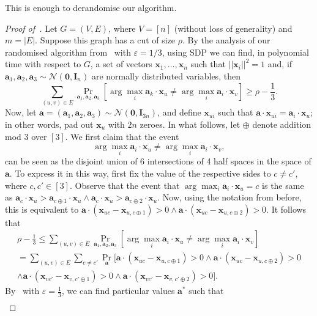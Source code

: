 \documentclass[a4paper,11pt, DIV=11]{scrartcl}
\newcommand{\vx}{\ensuremath{\mathbf{x}}}
\newcommand{\va}{\ensuremath{\mathbf{a}}}
\renewcommand{\epsilon}{\varepsilon}
\theoremstyle{plain}
\theoremstyle{definition}
\begin{document}
This is enough to derandomise our algorithm.

\begin{proof}[Proof of~]
    Let $G=(V,E)$, where $V = [n]$ (without loss of generality) and $m = |E|$.
    Suppose this graph has a cut of size $\rho$. By the analysis of our
    randomised algorithm from~ with $\epsilon=1/3$, using SDP we can find, in polynomial time with respect to $G$, a set of vectors $\vx_1, \ldots, \vx_n$ such that $|| \vx_i ||^2 = 1$ and, if $\va_1, \va_2, \va_3 \sim \mathcal{N}(\mathbf{0}, \mathbf{I}_n)$ are normally distributed variables, then
    \[
    \sum_{(u, v) \in E} \Pr_{\va_1, \va_2, \va_3} \left[ \arg \max_{i} \va_k \cdot \vx_u \neq 
    \arg \max_i \va_i \cdot \vx_v \right] \geq \rho - \frac{1}{3}.
    \]
    Now, let $\va = (\va_1, \va_2, \va_3) \sim \mathcal{N}(\mathbf{0}, \mathbf{I}_{3n})$, and define $\vx_{ui}$ such that $\va \cdot \vx_{ui} = \va_i \cdot \vx_u$; in other words, pad out $\vx_u$ with $2n$ zeroes. In what follows, let $\oplus$ denote addition mod 3 over $[3]$. We first claim that the event
    \[
    \arg \max_{i} \va_i \cdot \vx_u \neq \arg \max_i \va_i \cdot \vx_v,
    \]
    can be seen as the disjoint union of 6 intersections of 4 half spaces in the space of $\va$. To express it in this way, first fix the value of the respective sides to $c \neq c'$, where $c, c' \in [3]$. Observe that the event that $\arg \max_i \va_i \cdot \vx_u = c$ is the same as $\va_c \cdot \vx_u > \va_{c\oplus 1} \cdot \vx_u \land \va_c \cdot \vx_u > \va_{c \oplus 2} \cdot \vx_u$. Now, using the notation from before, this is equivalent to $\va \cdot (\vx_{uc} - \vx_{u, c\oplus 1}) > 0 \land
    \va \cdot (\vx_{uc} - \vx_{u, c\oplus 2}) > 0$. It follows that
    \begin{multline*}
    \rho - \frac{1}{3} \leq 
    \sum_{(u, v) \in E} \Pr_{\va_1, \va_2, \va_3} \left[ \arg \max_{i} \va_i \cdot \vx_u \neq 
    \arg \max_i \va_i \cdot \vx_v \right] \\
    =
    \sum_{(u, v) \in E} \sum_{c \neq c'} \Pr_{\va} [
    \va \cdot (\vx_{uc} -
    \vx_{u,c\oplus 1}) > 0
   \land 
    \va \cdot (\vx_{uc} 
    - \vx_{u,c\oplus 2}) > 0
    \\
   \land 
    \va \cdot (\vx_{vc'} -
    \vx_{v,c' \oplus 1}) > 0
   \land 
    \va \cdot (\vx_{vc'}-
     \vx_{v,c'\oplus 2}) > 0
    ].
    \end{multline*}
    By~ with $\epsilon = \frac{1}{3}$, we can find particular values $\va^*$ such that 
    \begin{multline*}

\end{multline*}
\end{proof}
\end{document}
